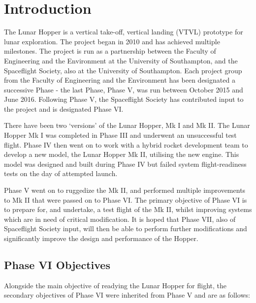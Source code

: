 \documentclass[12pt]{article}
\begin{document}
\newpage
\tableofcontents
\cleardoublepage



\section{Introduction}
The Lunar Hopper is a vertical take-off, vertical landing (VTVL) prototype for lunar exploration. The project began in 2010 and has achieved multiple milestones. The project is run as a partnership between the Faculty of Engineering and the Environment at the University of Southampton, and the Spaceflight Society, also at the University of Southampton. Each project group from the Faculty of Engineering and the Environment has been designated a successive Phase - the last Phase, Phase V, was run between October 2015 and June 2016. Following Phase V, the Spaceflight Society has contributed input to the project and is designated Phase VI.

There have been two `versions' of the Lunar Hopper, Mk I and Mk II. The Lunar Hopper Mk I was completed in Phase III and underwent an unsuccessful test flight. Phase IV then went on to work with a hybrid rocket development team to develop a new model, the Lunar Hopper Mk II, utilising the new engine. This model was designed and built during Phase IV but failed system flight-readiness tests on the day of attempted launch. 

Phase V went on to ruggedize the Mk II, and performed multiple improvements to Mk II that were passed on to Phase VI. The primary objective of Phase VI is to prepare for, and undertake, a test flight of the Mk II, whilst improving systems which are in need of critical modification. It is hoped that Phase VII, also of Spaceflight Society input, will then be able to perform further modifications and significantly improve the design and performance of the Hopper.

\subsection{Phase VI Objectives}

Alongside the main objective of readying the Lunar Hopper for flight, the secondary objectives of Phase VI were inherited from Phase V and are as follows:
\end{document}
